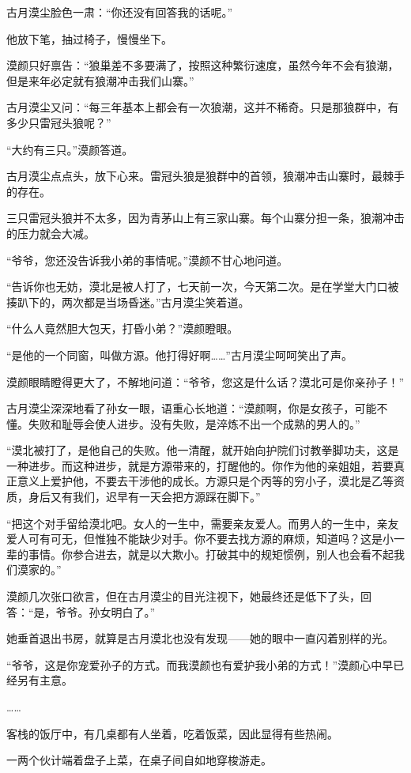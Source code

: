 \begin{this_body}
古月漠尘脸色一肃：“你还没有回答我的话呢。”

他放下笔，抽过椅子，慢慢坐下。

漠颜只好禀告：“狼巢差不多要满了，按照这种繁衍速度，虽然今年不会有狼潮，但是来年必定就有狼潮冲击我们山寨。”

古月漠尘又问：“每三年基本上都会有一次狼潮，这并不稀奇。只是那狼群中，有多少只雷冠头狼呢？”

“大约有三只。”漠颜答道。

古月漠尘点点头，放下心来。雷冠头狼是狼群中的首领，狼潮冲击山寨时，最棘手的存在。

三只雷冠头狼并不太多，因为青茅山上有三家山寨。每个山寨分担一条，狼潮冲击的压力就会大减。

“爷爷，您还没告诉我小弟的事情呢。”漠颜不甘心地问道。

“告诉你也无妨，漠北是被人打了，七天前一次，今天第二次。是在学堂大门口被揍趴下的，两次都是当场昏迷。”古月漠尘笑着道。

“什么人竟然胆大包天，打昏小弟？”漠颜瞪眼。

“是他的一个同窗，叫做方源。他打得好啊……”古月漠尘呵呵笑出了声。

漠颜眼睛瞪得更大了，不解地问道：“爷爷，您这是什么话？漠北可是你亲孙子！”

古月漠尘深深地看了孙女一眼，语重心长地道：“漠颜啊，你是女孩子，可能不懂。失败和耻辱会使人进步。没有失败，是淬炼不出一个成熟的男人的。”

“漠北被打了，是他自己的失败。他一清醒，就开始向护院们讨教拳脚功夫，这是一种进步。而这种进步，就是方源带来的，打醒他的。你作为他的亲姐姐，若要真正意义上爱护他，不要去干涉他的成长。方源只是个丙等的穷小子，漠北是乙等资质，身后又有我们，迟早有一天会把方源踩在脚下。”

“把这个对手留给漠北吧。女人的一生中，需要亲友爱人。而男人的一生中，亲友爱人可有可无，但惟独不能缺少对手。你不要去找方源的麻烦，知道吗？这是小一辈的事情。你参合进去，就是以大欺小。打破其中的规矩惯例，别人也会看不起我们漠家的。”

漠颜几次张口欲言，但在古月漠尘的目光注视下，她最终还是低下了头，回答：“是，爷爷。孙女明白了。”

她垂首退出书房，就算是古月漠北也没有发现——她的眼中一直闪着别样的光。

“爷爷，这是你宠爱孙子的方式。而我漠颜也有爱护我小弟的方式！”漠颜心中早已经另有主意。

……

客栈的饭厅中，有几桌都有人坐着，吃着饭菜，因此显得有些热闹。

一两个伙计端着盘子上菜，在桌子间自如地穿梭游走。


\end{this_body}
